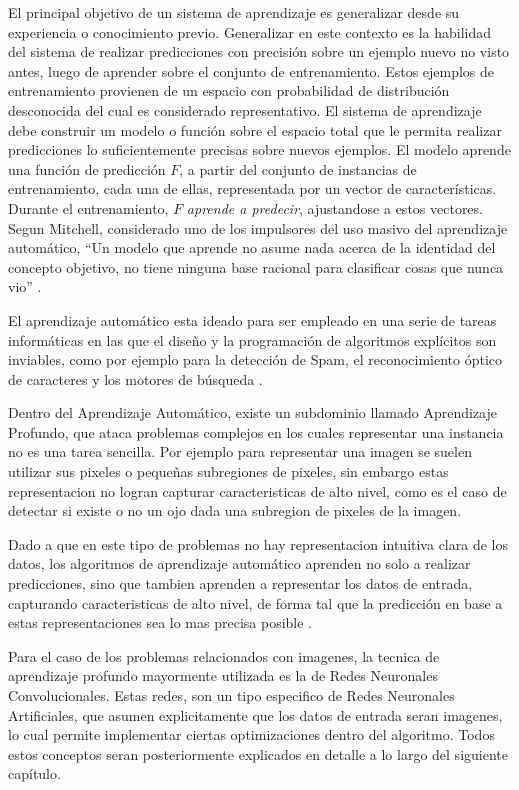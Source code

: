 \documentclass[a4paper,11pt,spanish]{book}
\begin{document}
      El principal objetivo de un sistema de aprendizaje es generalizar desde su experiencia o conocimiento previo. Generalizar en este contexto es la habilidad del sistema de realizar
      predicciones con precisión sobre un ejemplo nuevo no visto antes, luego de aprender sobre el conjunto de entrenamiento. Estos ejemplos de entrenamiento provienen de un espacio
      con probabilidad de distribución desconocida del cual es considerado representativo. El sistema de aprendizaje debe construir un modelo o función sobre el espacio total que le permita realizar
      predicciones lo suficientemente precisas sobre nuevos ejemplos. El modelo aprende una función de predicción $F$, a partir del conjunto de instancias de entrenamiento,
      cada una de ellas, representada por un vector de características.  Durante el entrenamiento, $F$  \emph{aprende a predecir}, ajustandose a estos vectores.
      Segun Mitchell, considerado uno de los impulsores del uso masivo del aprendizaje automático, “Un modelo que aprende no asume nada acerca de la identidad del concepto objetivo,
      no tiene ninguna base racional para clasificar cosas que nunca vio” \cite{Mitchell:1997:ML:541177}.

      El aprendizaje automático esta ideado para ser empleado en una serie de tareas informáticas en las que el diseño y la programación de algoritmos explícitos son inviables,
      como por ejemplo para la detección de Spam, el reconocimiento óptico de caracteres y los motores de búsqueda \cite{Bishop:MachineLearning}.

      Dentro del Aprendizaje Automático, existe un subdominio llamado Aprendizaje Profundo, que ataca problemas complejos en los cuales representar una instancia no es una tarea sencilla.
      Por ejemplo para representar una imagen se suelen utilizar sus pixeles o pequeñas subregiones de pixeles, sin embargo estas representacion no logran capturar caracteristicas de
      alto nivel, como es el caso de detectar si existe o no un ojo dada una subregion de pixeles de la imagen.

      Dado a que en este tipo de problemas no hay representacion intuitiva clara de los datos, los algoritmos de aprendizaje automático aprenden no solo a realizar predicciones, sino
      que tambien aprenden a representar los datos de entrada, capturando caracteristicas de alto nivel, de forma tal que la predicción en base a estas representaciones sea lo mas precisa posible \cite{Goodfellow-et-al-2016}.

      Para el caso de los problemas relacionados con imagenes, la tecnica de aprendizaje profundo mayormente utilizada es la de Redes Neuronales Convolucionales.
      Estas redes, son un tipo especifico de Redes Neuronales Artificiales, que asumen explicitamente que los datos de entrada seran imagenes, lo cual permite implementar
      ciertas optimizaciones dentro del algoritmo. Todos estos conceptos seran posteriormente explicados en detalle a lo largo del siguiente capítulo.
\end{document}
